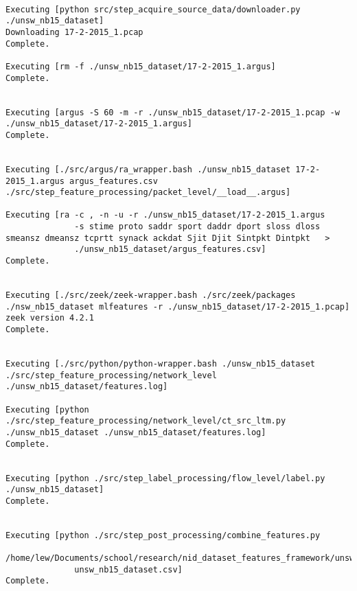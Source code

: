 \documentclass[sigconf]{acmart}
\begin{document}
\begin{lstlisting}[float=*, label=lst:sampleoutput, caption={
    The expected output seen in a terminal window after running our sample implementation.
    Seeing the actual commands that run alleviates any ambiguity regarding how a dataset was created in comparison to simply describing the methodology.
    Note that we have added some line breaks in the listing to make the output easier to view.
    }, captionpos=b, basicstyle=\tiny, backgroundcolor=\color{gray!10!white}, frame=stb, breaklines=True]

Executing [python src/step_acquire_source_data/downloader.py ./unsw_nb15_dataset]
Downloading 17-2-2015_1.pcap
Complete.

Executing [rm -f ./unsw_nb15_dataset/17-2-2015_1.argus]
Complete.


Executing [argus -S 60 -m -r ./unsw_nb15_dataset/17-2-2015_1.pcap -w ./unsw_nb15_dataset/17-2-2015_1.argus]
Complete.


Executing [./src/argus/ra_wrapper.bash ./unsw_nb15_dataset 17-2-2015_1.argus argus_features.csv ./src/step_feature_processing/packet_level/__load__.argus]

Executing [ra -c , -n -u -r ./unsw_nb15_dataset/17-2-2015_1.argus 
              -s stime proto saddr sport daddr dport sloss dloss smeansz dmeansz tcprtt synack ackdat Sjit Djit Sintpkt Dintpkt   > 
              ./unsw_nb15_dataset/argus_features.csv]
Complete.


Executing [./src/zeek/zeek-wrapper.bash ./src/zeek/packages ./nsw_nb15_dataset mlfeatures -r ./unsw_nb15_dataset/17-2-2015_1.pcap]
zeek version 4.2.1
Complete.


Executing [./src/python/python-wrapper.bash ./unsw_nb15_dataset ./src/step_feature_processing/network_level ./unsw_nb15_dataset/features.log]

Executing [python ./src/step_feature_processing/network_level/ct_src_ltm.py ./unsw_nb15_dataset ./unsw_nb15_dataset/features.log]
Complete.


Executing [python ./src/step_label_processing/flow_level/label.py ./unsw_nb15_dataset]
Complete.


Executing [python ./src/step_post_processing/combine_features.py 
              /home/lew/Documents/school/research/nid_dataset_features_framework/unsw_nb15_dataset 
              unsw_nb15_dataset.csv]
Complete.

\end{lstlisting}
\end{document}
